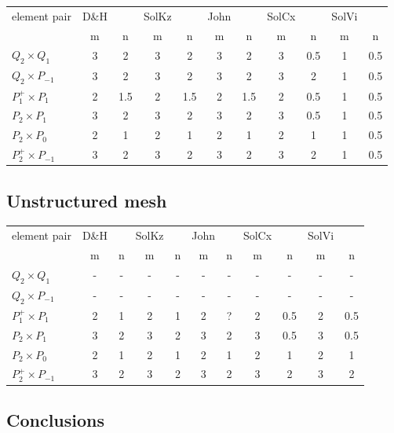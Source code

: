 \begin{center}
\begin{tabular}{|l|cc|cc|cc|cc|cc|}
\hline
element pair          & D\&H && SolKz  &&  John  && SolCx &&  SolVi & \\
                      & m&n& m&n& m&n& m&n& m&n \\
$Q_2\times Q_1$       & 3&2    & 3&2     & 3&2    & 3&0.5   & 1 & 0.5 \\ 
$Q_2\times P_{-1}$    & 3&2    & 3&2     & 3&2    & 3&2     & 1 & 0.5 \\ 
$P_1^+\times P_{1}$   & 2&1.5  & 2&1.5   & 2&1.5  & 2&0.5   & 1 & 0.5 \\ 
$P_2\times P_1$       & 3&2    & 3&2     & 3&2    & 3&0.5   & 1 & 0.5 \\ 
$P_2\times P_0$       & 2&1    & 2&1     & 2&1    & 2&1     & 1 & 0.5 \\ 
$P_2^+\times P_{-1}$  & 3&2    & 3&2     & 3&2    & 3&2     & 1 & 0.5 \\ 
\hline
\end{tabular}
\end{center}

\subsection*{Unstructured mesh}

\begin{center}
\begin{tabular}{|l|cc|cc|cc|cc|cc|}
\hline
element pair          & D\&H && SolKz  &&  John  && SolCx &&  SolVi & \\
                      & m&n& m&n& m&n& m&n& m&n \\
$Q_2\times Q_1$       &  -&- & -&- &  -&- &  -&-   & -&-\\
$Q_2\times P_{-1}$    &  -&- & -&- &  -&- &  -&-   & -&-\\
$P_1^+\times P_{1}$   &  2&1 & 2&1 &  2&? &  2&0.5 & 2 & 0.5 \\
$P_2\times P_1$       &  3&2 & 3&2 &  3&2 &  3&0.5 & 3 & 0.5 \\
$P_2\times P_0$       &  2&1 & 2&1 &  2&1 &  2&1   & 2 & 1 \\
$P_2^+\times P_{-1}$  &  3&2 & 3&2 &  3&2 &  3&2   & 3 & 2 \\
\hline
\end{tabular}
\end{center}

\subsection*{Conclusions}

